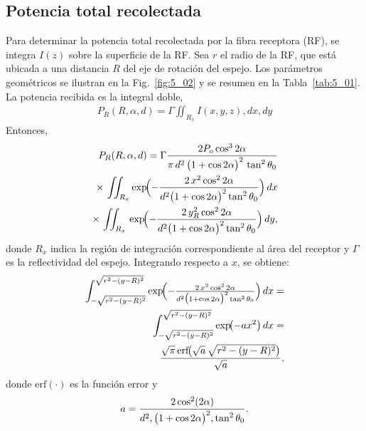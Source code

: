 \documentclass[11pt,a4paper]{article}
\begin{document}
\begin{multicols}{2}
\subsection{Potencia total recolectada}\label{sec:5_01_05}
Para determinar la potencia total recolectada por la fibra receptora (RF), se integra $I(z)$ sobre la superficie de la RF. Sea $r$ el radio de la RF, que está ubicada a una distancia $R$ del eje de rotación del espejo. Los parámetros geométricos se ilustran en la Fig.~\ref{fig:5_02} y se resumen en la Tabla~\ref{tab:5_01}. \vspace{-0.5\baselineskip}La potencia recibida es la integral doble,
%
%
\begin{gather}
    P_{R}(R,\alpha,d) = \Gamma\iint_{R_x} I(x, y, z) , dx , dy
    \label{eq:equ4}
\end{gather}
Entonces,
%
%
\begin{align}
    P_{R}(R,\alpha,d) =
    \Gamma\dfrac{2P_o \cos^3 2\alpha}{\pi \, d^2 \,\bigl(1 + \cos 2\alpha\bigr)^2 \,\tan^2 \theta_0}
    \notag\\
    \times \,\iint_{R_x}\exp\!\Bigl(-\dfrac{2\,x^2 \cos^2 2\alpha}{d^2 \bigl(1 + \cos 2\alpha\bigr)^2 \tan^2 \theta_0}\Bigr) \, dx
    \notag\\
    \times \,\iint_{R_x}\,\exp\!\Bigl(-\dfrac{2\,y_R^2 \cos^2 2\alpha}{d^2 \bigl(1 + \cos 2\alpha\bigr)^2 \tan^2 \theta_0}\Bigr)\, dy,
    \label{eq:equ5}
\end{align}
%
%
donde $R_x$ indica la región de integración correspondiente al área del receptor y $\Gamma$ es la reflectividad del espejo. Integrando respecto a $x$, se obtiene:
%
%
\begin{align}
    \int_{-\sqrt{r^2 - (y - R)^2}}^{\sqrt{r^2 - (y - R)^2}}
    \exp\!\Bigl(-\tfrac{2\,x^2 \cos^2 2\alpha}{d^2 \bigl(1 + \cos 2\alpha\bigr)^2 \tan^2 \theta_0}\Bigr)
    \, dx=\notag\\
    \int_{-\sqrt{r^2 - (y - R)^2}}^{\sqrt{r^2 - (y - R)^2}} \exp\!\bigl(-a x^2\bigr)\, dx=\notag\\ \frac{\sqrt{\pi} \,\mathrm{erf}\!\bigl(\sqrt{a}\,\sqrt{r^2 - (y - R)^2}\bigr)}{\sqrt{a}},
    \label{eq:equ6}
\end{align}
%
donde $\mathrm{erf}(\cdot)$ es la función error y
%
%
\begin{gather}
    a = \frac{2 \cos^2(2\alpha)}{ d^2 ,\bigl(1+\cos 2\alpha\bigr)^2 ,\tan^2 \theta_0}.\notag
\end{gather}
%
%


\end{multicols}
\end{document}
